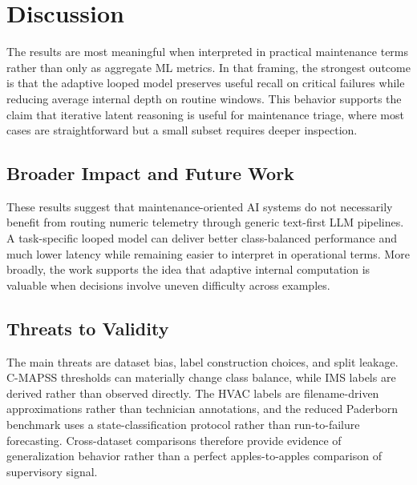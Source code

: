 \section{Discussion}
The results are most meaningful when interpreted in practical maintenance terms rather than only as aggregate ML metrics. In that framing, the strongest outcome is that the adaptive looped model preserves useful recall on critical failures while reducing average internal depth on routine windows. This behavior supports the claim that iterative latent reasoning is useful for maintenance triage, where most cases are straightforward but a small subset requires deeper inspection.

\subsection{Broader Impact and Future Work}
These results suggest that maintenance-oriented AI systems do not necessarily benefit from routing numeric telemetry through generic text-first LLM pipelines. A task-specific looped model can deliver better class-balanced performance and much lower latency while remaining easier to interpret in operational terms. More broadly, the work supports the idea that adaptive internal computation is valuable when decisions involve uneven difficulty across examples.

\subsection{Threats to Validity}
The main threats are dataset bias, label construction choices, and split leakage. C-MAPSS thresholds can materially change class balance, while IMS labels are derived rather than observed directly. The HVAC labels are filename-driven approximations rather than technician annotations, and the reduced Paderborn benchmark uses a state-classification protocol rather than run-to-failure forecasting. Cross-dataset comparisons therefore provide evidence of generalization behavior rather than a perfect apples-to-apples comparison of supervisory signal.


